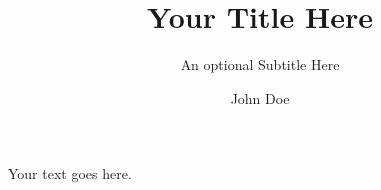 \documentclass{article}
\title{Your Title Here}
\subtitle{An optional Subtitle Here}
\author{John Doe}
\begin{document}
\maketitle

Your text goes here.
\end{document}
